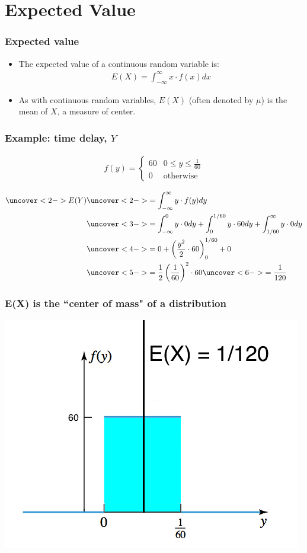 \documentclass[handout]{beamer}\usepackage{graphicx, color}
\numberwithin{equation}{section}
\begin{document}
\section{Expected Value}

\begin{frame}
\frametitle{Expected value}
\begin{itemize}
\pause \item The expected value of a continuous random variable is:
\pause \begin{align*}
E(X) = \int_{-\infty}^\infty x \cdot f(x) dx
\end{align*}
\pause \item As with continuous random variables, $E(X)$ (often denoted by $\mu$) is the mean of $X$, a measure of center.
\end{itemize}
\end{frame}

\begin{frame}
\frametitle{Example: time delay, $Y$}

\begin{align*}
f(y) = \begin{cases}
60 & 0 \le y \le \frac{1}{60} \\
0 & \text{otherwise}
\end{cases}
\end{align*}

\begin{align*}
\uncover<2->{E(Y)} &\uncover<2->{= \int_{-\infty}^\infty y \cdot f(y) dy }\\
&\uncover<3->{= \int_{-\infty}^0 y \cdot  0 dy + \int_{0}^{1/60} y \cdot 60 dy + \int_{1/60}^\infty y \cdot 0 dy} \\
&\uncover<4->{= 0 + \left ( \frac{y^2}{2} \cdot 60 \right )_0^{1/60} + 0} \\
&\uncover<5->{= \frac{1}{2}  \left (\frac{1}{60} \right)^2 \cdot 60} \uncover<6->{ = \frac{1}{120}}
\end{align*}
\end{frame}

\begin{frame}
\frametitle{E(X) is the ``center of mass" of a distribution}
 \includegraphics{../../fig/delaypictwex.png}
\end{frame}
\end{document}
